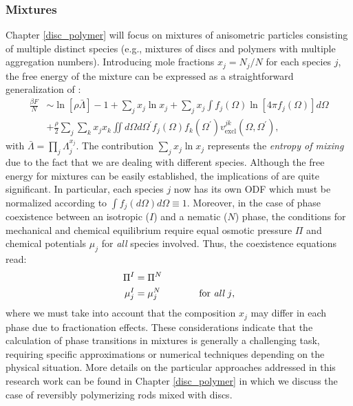 \subsubsection{Mixtures}

Chapter \ref{disc_polymer} will focus on mixtures of anisometric particles consisting of multiple distinct species (e.g., mixtures of discs and polymers with multiple aggregation numbers). Introducing mole fractions $x_{j}=N_{j}/N$ for each species $j$, the free energy of the mixture can be expressed as a straightforward generalization of :
\begin{align}
\frac{\beta F}{N} &\sim \ln [\rho \bar{\Lambda}]-1 + \sum_{j} x_{j} \ln x_{j} +
\sum_{j} x_{j} \int f_{j}(\Omega)\ln \left[ 4 \pi f_{j}(\Omega) \right] d \Omega \nonumber \\
&+\frac{\rho}{2}\sum_{j}\sum_{k}x_{j}x_{k} \iint  d \Omega d\Omega^{\prime}
f_{j}(\Omega)f_{k}(\Omega^{\prime})
v_{\text{excl}}^{jk}(\Omega,\Omega^{\prime}),  \label{0freetotmulti}
\end{align}
with $\bar{\Lambda}=\prod_{j}\Lambda_{j}^{x_{j}}$. The contribution $\sum_{j} x_{j} \ln x_{j}$ represents the {\em entropy of mixing} due to the fact that we are dealing with different species. Although the free energy for mixtures can be easily established,  the implications of  are quite significant. In particular, each species $j$ now has its own ODF which must be normalized according to $\int f_{j}(d\Omega)d\Omega \equiv 1$. Moreover, in the case of phase coexistence between an isotropic ($I$) and a nematic ($N$) phase, the conditions for mechanical and chemical equilibrium require equal osmotic pressure $\Pi$ and chemical potentials $\mu_{j}$ for {\em all} species involved. Thus, the coexistence equations read:
\begin{align}
\Pi^{I}&=\Pi^{N} \nonumber \\
\mu^{I}_{j}&=\mu^{N}_{j} \qquad\qquad \text{for {\em all} $j$},
\end{align}
where we must take into account that the composition ${x_{j}}$ may differ in each phase due to fractionation effects. These considerations indicate that the calculation of phase transitions in mixtures is generally a challenging task, requiring specific approximations or numerical techniques depending on the physical situation. More details on the particular approaches addressed in this research work can be found in Chapter \ref{disc_polymer} in which we discuss the case of reversibly polymerizing rods mixed with discs.

